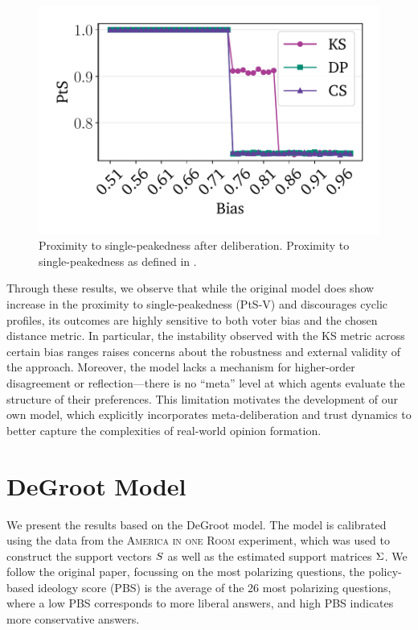 \documentclass[11pt, oneside, dvipsnames]{Thesis} %
\begin{document}
\begin{figure}[htbp]
	\begin{minipage}{0.45\textwidth}
		\centering
		\vspace{-9pt}
		\includegraphics[width=\textwidth]{Figures/sp_proximity_PtS.pdf}
		\caption{Proximity to single-peakedness after deliberation. Proximity to single-peakedness as defined in .}
		\label{fig:rep_single_peaked}
	\end{minipage}
\end{figure}

Through these results, we observe that while the original model does show
increase in the proximity to single-peakedness (PtS-V) and discourages cyclic
profiles, its outcomes are highly sensitive to both voter bias and the chosen
distance metric. In particular, the instability observed with the KS metric
across certain bias ranges raises concerns about the robustness and external
validity of the approach. Moreover, the model lacks a mechanism for
higher-order disagreement or reflection—there is no ``meta'' level at which
agents evaluate the structure of their preferences. This limitation motivates
the development of our own model, which explicitly incorporates
meta-deliberation and trust dynamics to better capture the complexities of
real-world opinion formation.

\newpage
\section{DeGroot Model}\label{degroot_results}

We present the results based on the DeGroot model. The model is calibrated using the
data from the \textsc{America in one Room} experiment, which was used to
construct the support vectors $S$ as well as the estimated support
matrices $\Sigma$. We follow the original paper, focussing on the most
polarizing questions, the
policy-based ideology score (PBS) is the average of the 26 most polarizing
questions, where a low PBS corresponds to more liberal answers, and high PBS
indicates more conservative answers.
\end{document}
